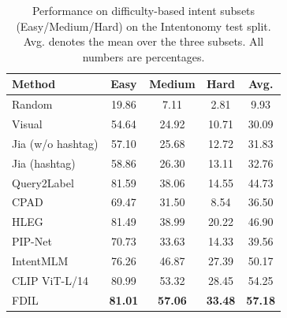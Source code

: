 \begin{table}[t]
\centering
\caption{Performance on difficulty-based intent subsets (Easy/Medium/Hard) on the Intentonomy test split. Avg. denotes the mean over the three subsets. All numbers are percentages.}
\label{tab:difficulty_results}
\begin{tabular}{lcccc}
\hline
Method & Easy & Medium & Hard & Avg. \\
\hline
Random & 19.86 & 7.11 & 2.81 & 9.93 \\
Visual \cite{he_deep_2016} & 54.64 & 24.92 & 10.71 & 30.09 \\
Jia (w/o hashtag) \cite{jia_intentonomy_2021} & 57.10 & 25.68 & 12.72 & 31.83 \\
Jia (hashtag) \cite{jia_intentonomy_2021} & 58.86 & 26.30 & 13.11 & 32.76 \\
Query2Label \cite{liu_query2label_2021} & 81.59 & 38.06 & 14.55 & 44.73 \\
CPAD \cite{ye_cross-modality_2023} & 69.47 & 31.50 & 8.54 & 36.50 \\
HLEG \cite{shi_learnable_2023} & 81.49 & 38.99 & 20.22 & 46.90 \\
PIP-Net \cite{wang_prototype-based_2023} & 70.73 & 33.63 & 14.33 & 39.56 \\
IntentMLM \cite{wang_unlocking_2026} & 76.26 & 46.87 & 27.39 & 50.17 \\
\hline
CLIP ViT-L/14 \cite{radford_learning_2021} & 80.99 & 53.32 & 28.45 & 54.25 \\
FDIL & \textbf{81.01} & \textbf{57.06} & \textbf{33.48} & \textbf{57.18} \\
\hline
\end{tabular}
\end{table}

